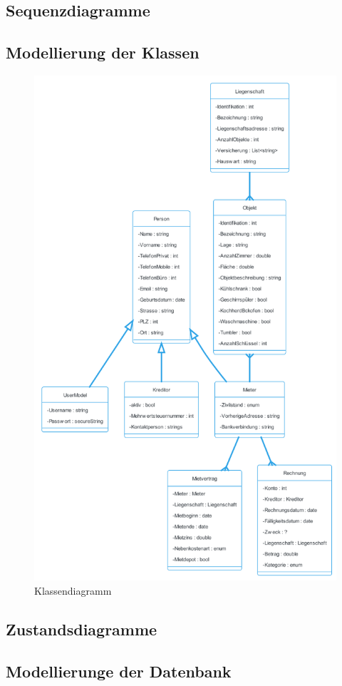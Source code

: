 \subsection{Sequenzdiagramme}
\subsection{Modellierung der Klassen}
\begin{figure}[h]
  \begin{center}
    \includegraphics[width=0.75\linewidth]{content/diagrams/out/classdiagramm/ImmoGlobal.png}
    \caption{Klassendiagramm}
  \end{center}
\end{figure}

\subsection{Zustandsdiagramme}
\subsection{Modellierunge der Datenbank}
